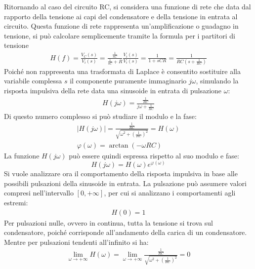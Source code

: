 \documentclass{article}
\numberwithin{equation}{subsection}
\begin{document}
Ritornando al caso del circuito RC, si considera una funzione di rete che data dal rapporto della tensione ai capi del condensatore e della tensione in entrata al circuito. 
Questa funzione di rete rappresenta un'amplificazione o guadagno in tensione, si può calcolare semplicemente tramite la formula per i partitori di tensione
\begin{gather*}
    H(f)=\displaystyle\frac{V_C(s)}{V_{i}(s)}=\frac{\displaystyle\frac{1}{sC}}{\frac{1}{sC}+R}\frac{V_{i}(s)}{V_i(s)}=\frac{1}{1+sCR}=\frac{1}{RC\left(s+\displaystyle\frac{1}{RC}\right)}
\end{gather*}
Poiché non rappresenta una trasformata di Laplace è consentito sostituire alla variabile complessa $s$ il componente puramente immaginario $j\omega$, simulando la risposta 
impulsiva della rete data una sinusoide in entrata di pulsazione $\omega$:
\begin{gather*}
    H(j\omega)=\displaystyle\frac{\displaystyle\frac{1}{RC}}{j\omega+\displaystyle\frac{1}{RC}}
\end{gather*}
Di questo numero complesso si può studiare il modulo e la fase:
\begin{gather}
    |H(j\omega)|=\displaystyle\frac{\displaystyle\frac{1}{RC}}{\sqrt{\displaystyle\omega^2+\left(\frac{1}{RC}\right)^2}}=H(\omega)\\
    \varphi(\omega)=\arctan\left(-\omega RC\right)
\end{gather}
La funzione $H(j\omega)$ può essere quindi espressa rispetto al suo modulo e fase:
\begin{equation}
    H(j\omega)=H(\omega)e^{\varphi(\omega)}
\end{equation}
Si vuole analizzare ora il comportamento della risposta impulsiva in base alle possibili pulsazioni della sinusoide in entrata. 
La pulsazione può assumere valori compresi nell'intervallo $[0,+\infty]$, per cui si analizzano i comportamenti agli estremi:
\begin{gather*}
    H(0)=1
\end{gather*}
Per pulsazioni nulle, ovvero in continua, tutta la tensione si trova sul condensatore, poiché corrisponde all'andamento della carica di un condensatore. 
Mentre per pulsazioni tendenti all'infinito si ha:
\begin{gather*}
    \lim_{\omega\to+\infty}H(\omega)=\lim_{\omega\to+\infty}\displaystyle\frac{\displaystyle\frac{1}{RC}}{\sqrt{\displaystyle\omega^2+\left(\frac{1}{RC}\right)^2}}=0
\end{gather*}
\end{document}
